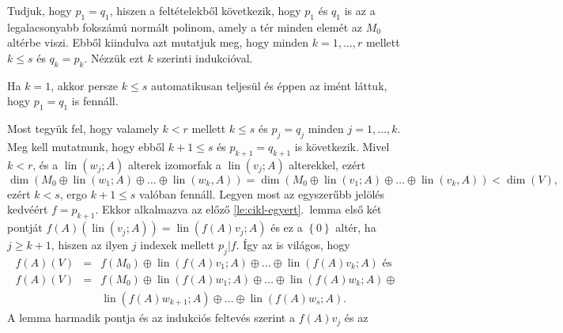 \documentclass[9pt, a4paper, showtrims]{memoir}
\makeatletter
\renewenvironment{proof}[1][\proofname]
    {\par\pushQED{\qed}%
    \normalfont \topsep6\p@\@plus6\p@\relax
    \trivlist
    \item[\hskip\labelsep
        \itshape
    #1\@addpunct{:}]\ignorespaces}
    {\popQED\endtrivlist\@endpefalse}
\theoremstyle{plain}
\theoremstyle{remark}
\theoremstyle{definition}
\DeclareMathOperator{\lin}{lin}
\makeatother
\begin{document}
\begin{proof}
    Tudjuk, hogy $p_1=q_1$, hiszen a feltételekből következik, hogy $p_1$ és $q_1$ is az a legalacsonyabb fokszámú normált polinom, amely a tér minden elemét az $M_0$ altérbe viszi.
    Ebből kiindulva azt mutatjuk meg, 
    hogy minden $k=1,\ldots,r$ mellett $k\leq s$ és $q_k=p_k$.
    Nézzük ezt $k$ szerinti indukcióval.

    Ha $k=1$, akkor persze $k\leq s$ automatikusan teljesül és éppen az imént láttuk, hogy $p_1=q_1$ is fennáll.

    Most tegyük fel, hogy valamely $k<r$ mellett $k\leq s$ és $p_j=q_j$ minden $j=1,\ldots,k$.
    Meg kell mutatnunk, hogy ebből $k+1\leq s$ és $p_{k+1}=q_{k+1}$ is következik.
    Mivel $k<r$, és a $\lin\left( w_j;A \right)$ alterek izomorfak a $\lin\left( v_j;A \right)$ alterekkel,
    ezért
    \begin{displaymath}
        \dim(M_0\oplus\lin\left( w_1;A \right)
        \oplus\ldots\oplus
        \lin\left( w_k,A \right))
        =
        \dim(M_0\oplus\lin\left( v_1;A \right)
        \oplus\ldots\oplus
        \lin\left( v_k,A \right))
        <
        \dim\left( V \right),
    \end{displaymath}
    ezért $k<s$, ergo $k+1\leq s$ valóban fennáll.
    Legyen most az egyszerűbb jelölés kedvéért $f=p_{k+1}$.
    Ekkor alkalmazva az előző \ref{le:cikl-egyert}.~lemma első két pontját 
    $f\left( A \right)\left( \lin\left( v_j;A \right) \right)
    =
    \lin\left( f\left( A \right)v_j;A \right)
    $ és ez a 
    $\left\{ 0 \right\}$ 
    altér, ha $j\geq k+1$, hiszen az ilyen $j$ indexek mellett $p_j|f$.
    Így az is világos, hogy
    \begin{eqnarray*}
        f\left( A \right)(V)
        &=& 
        f\left( M_0 \right)
        \oplus
        \lin\left( f\left( A \right)v_1;A \right)
        \oplus\ldots\oplus
        \lin\left( f\left( A \right)v_k;A \right)
        \text{ és }
        \\
        f\left( A \right)(V)
        &=& 
        f\left( M_0 \right)
        \oplus
        \lin\left( f\left( A \right)w_1;A \right)
        \oplus\ldots\oplus
        \lin\left( f\left( A \right)w_k;A \right)
        \oplus
        \\
        &&
        \lin\left( f\left( A \right)w_{k+1};A \right)
        \oplus\ldots\oplus
        \lin\left( f\left( A \right)w_s;A \right).
    \end{eqnarray*}
    A lemma harmadik pontja és az indukciós feltevés szerint a $f\left( A \right)v_j$ és az

\end{proof}
\end{document}
